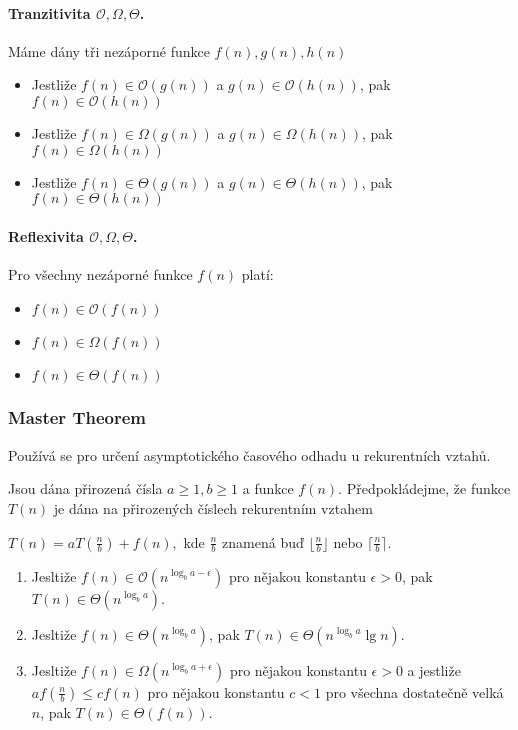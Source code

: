 \paragraph{Tranzitivita $\mathcal{O}, \Omega, \Theta$.} Máme dány tři nezáporné funkce $f(n), g(n), h(n)$
\begin{itemize}[itemsep=0pt]
    \item Jestliže $f(n) \in \mathcal{O}(g(n))$ a $g(n) \in \mathcal{O}(h(n))$, pak $f(n) \in \mathcal{O}(h(n))$
    \item Jestliže $f(n) \in \Omega(g(n))$ a $g(n) \in \Omega(h(n))$, pak $f(n) \in \Omega(h(n))$
    \item Jestliže $f(n) \in \Theta(g(n))$ a $g(n) \in \Theta(h(n))$, pak $f(n) \in \Theta(h(n))$
\end{itemize}

\paragraph{Reflexivita $\mathcal{O}, \Omega, \Theta$.} Pro všechny nezáporné funkce $f(n)$ platí:
\begin{itemize}[itemsep=0pt]
    \item $f(n) \in \mathcal{O}(f(n))$
    \item $f(n) \in \Omega(f(n))$
    \item $f(n) \in \Theta(f(n))$
\end{itemize}

\subsubsection*{Master Theorem}
\label{heading:mastertheorem}
Používá se pro určení asymptotického časového odhadu u rekurentních vztahů.

\noindent
Jsou dána přirozená čísla $a \geq 1, b \geq 1$ a funkce $f(n)$. Předpokládejme, že funkce $T(n)$ je dána na přirozených číslech rekurentním vztahem

\begin{center}
    $T(n)=aT\left(\frac{n}{b}\right)+f(n),$ kde $\frac{n}{b}$ znamená buď $\lfloor \frac{n}{b} \rfloor$ nebo $\lceil \frac{n}{b} \rceil$.
\end{center}

\begin{enumerate}[itemsep=0pt]
    \item Jesltiže $f(n) \in \mathcal{O}(n^{\log_ba - \epsilon})$ pro nějakou konstantu $\epsilon > 0$, pak $T(n) \in \Theta(n^{\log_ba})$.
    
    \item Jesltiže $f(n) \in \Theta(n^{\log_ba})$, pak $T(n) \in \Theta(n^{\log_ba} \lg n)$.
    
    \item Jesltiže $f(n) \in \Omega(n^{\log_ba + \epsilon})$ pro nějakou konstantu $\epsilon > 0$ a jestliže $a f(\frac{n}{b}) \leq c f(n)$ pro nějakou konstantu $c < 1$ pro všechna dostatečně velká $n$, pak $T(n) \in \Theta(f(n))$.
\end{enumerate}

